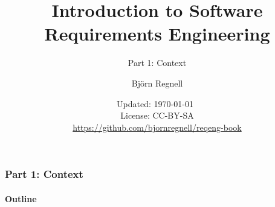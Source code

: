 \documentclass{reqenglecture}
\title{Introduction to Software Requirements Engineering}
\subtitle{Part 1: Context}
\author{Björn Regnell}
\date{\vspace{1em}\footnotesize Updated: \today~
\\ License: CC-BY-SA 
\\ \url{https://github.com/bjornregnell/reqeng-book} 
}
\begin{document}
\maketitle

\begin{frame}
\frametitle{Part 1: Context}
\framesubtitle{Outline}
\tableofcontents
\end{frame}





















\end{document}
